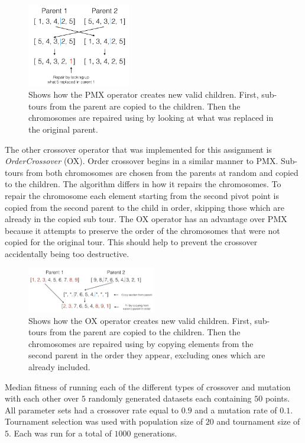 \documentclass[journal]{IEEEtran}
\begin{document}
\begin{figure}[H]
\centering
\includegraphics[width=0.4\textwidth]{img/pmx_diagram.jpg}
\caption{Shows how the PMX operator creates new valid children. First, sub-tours from the parent are copied to the children. Then the chromosomes are repaired using by looking at what was replaced in the original parent.}
\label{fig:pmx-diagram}
\end{figure}

The other crossover operator that was implemented for this assignment is \textit{OrderCrossover} \cite{moscato1989genetic} (OX). Order crossover begins in a similar manner to PMX. Sub-tours from both chromosomes are chosen from the parents at random and copied to the children. The algorithm differs in how it repairs the chromosomes. To repair the chromosome each element starting from the second pivot point is copied from the second parent to the child in order, skipping those which are already in the copied sub tour. The OX operator has an advantage over PMX because it attempts to preserve the order of the chromosomes that were not copied for the original tour. This should help to prevent the crossover accidentally being too destructive.

\begin{figure}[H]
\centering
\includegraphics[width=0.5\textwidth]{img/order_diagram.jpg}
\caption{Shows how the OX operator creates new valid children. First, sub-tours from the parent are copied to the children. Then the chromosomes are repaired using by copying elements from the second parent in the order they appear, excluding ones which are already included.}
\label{fig:order-diagram}
\end{figure}

\begin{table}[t]
\centering

\caption{Median fitness of running each of the different types of crossover and mutation with each other over $5$ randomly generated datasets each containing $50$ points. All parameter sets had a crossover rate equal to $0.9$ and a mutation rate of $0.1$. Tournament selection was used with population size of $20$ and tournament size of $5$. Each was run for a total of $1000$ generations.}
\label{table:cross-vs-mutate}
\end{table}
\end{document}

